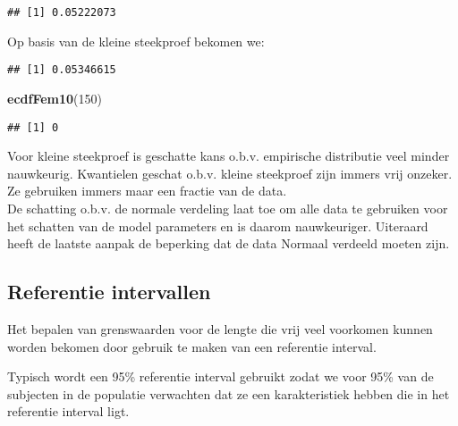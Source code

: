 \documentclass[
  12pt,dutch,coursenotes]{book}
\newenvironment{Shaded}{\begin{snugshade}}{\end{snugshade}}
\newcommand{\DecValTok}[1]{\textcolor[rgb]{0.00,0.00,0.81}{#1}}
\newcommand{\KeywordTok}[1]{\textcolor[rgb]{0.13,0.29,0.53}{\textbf{#1}}}
\newcommand{\NormalTok}[1]{#1}
\newcommand{\OperatorTok}[1]{\textcolor[rgb]{0.81,0.36,0.00}{\textbf{#1}}}
\theoremstyle{definition}
\theoremstyle{definition}
\theoremstyle{definition}
\theoremstyle{remark}
\begin{document}
\begin{verbatim}
## [1] 0.05222073
\end{verbatim}

Op basis van de kleine steekproef bekomen we:

\begin{Shaded}
\end{Shaded}

\begin{verbatim}
## [1] 0.05346615
\end{verbatim}

\begin{Shaded}
\begin{Highlighting}[]
\KeywordTok{ecdfFem10}\NormalTok{(}\DecValTok{150}\NormalTok{)}
\end{Highlighting}
\end{Shaded}

\begin{verbatim}
## [1] 0
\end{verbatim}

Voor kleine steekproef is geschatte kans o.b.v. empirische distributie veel minder nauwkeurig.
Kwantielen geschat o.b.v. kleine steekproef zijn immers vrij onzeker. Ze gebruiken immers maar een fractie van de data.\\
De schatting o.b.v. de normale verdeling laat toe om alle data te gebruiken voor het schatten van de model parameters en is daarom nauwkeuriger. Uiteraard heeft de laatste aanpak de beperking dat de data Normaal verdeeld moeten zijn.

\hypertarget{referentie-intervallen}{%
\subsection{Referentie intervallen}\label{referentie-intervallen}}

Het bepalen van grenswaarden voor de lengte die vrij veel voorkomen kunnen worden bekomen door gebruik te maken van een referentie interval.

Typisch wordt een 95\% referentie interval gebruikt zodat we voor 95\% van de subjecten in de populatie verwachten dat ze een karakteristiek hebben die in het referentie interval ligt.
\end{document}
